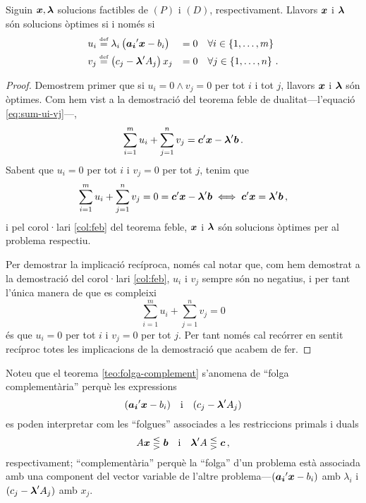 \begin{teo}\label{teo:folga-complement}
    Siguin $\boldsymbol{x}, \boldsymbol{\lambda}$ solucions factibles de $\left(P\right)$ i $\left(D\right)$, respectivament. Llavors $\boldsymbol{x}$ i $\boldsymbol{\lambda}$ són solucions òptimes si i només si
    \begin{alignat*}{2}{}
        u_i &\stackrel{\text{\tiny def}}{=} \lambda_i \left(\boldsymbol{a_i}'\boldsymbol{x} - b_i\right) &= 0 &\quad \forall i \in \left\{1, \dots, m\right\} \\
        v_j &\stackrel{\text{\tiny def}}{=} \left(c_j - \boldsymbol{\lambda}'A_j\right) x_j &= 0 &\quad \forall j \in \left\{1, \dots, n\right\}\,.
    \end{alignat*}
    \begin{proof}
    	Demostrem primer que si $u_i = 0 \land v_j = 0$ per tot $i$ i tot $j$, llavors $\boldsymbol{x}$ i $\boldsymbol{\lambda}$ són òptimes. Com hem vist a la demostració del teorema feble de dualitat---l'equació \eqref{eq:sum-ui-vj}---, 
    	\begin{equation*}
	    	\sum_{i = 1}^{m} u_i + \sum_{j = 1}^{n} v_j = \boldsymbol{c}'\boldsymbol{x} - \boldsymbol{\lambda}'\boldsymbol{b}\,.
    	\end{equation*}
    	Sabent que $u_i = 0$ per tot $i$ i $v_j = 0$ per tot $j$, tenim que \[\sum_{i = 1}^{m} u_i + \sum_{j = 1}^{n} v_j = 0 = \boldsymbol{c}'\boldsymbol{x} - \boldsymbol{\lambda}'\boldsymbol{b} \iff \boldsymbol{c}'\boldsymbol{x} = \boldsymbol{\lambda}'\boldsymbol{b}\,,  \] i pel corol·lari \ref{col:feb} del teorema feble, $\boldsymbol{x}$ i $\boldsymbol{\lambda}$ són solucions òptimes per al problema respectiu.
    	
    	Per demostrar la implicació recíproca, només cal notar que, com hem demostrat a la demostració del corol·lari \ref{col:feb}, $u_i$ i $v_j$ sempre són no negatius, i per tant l'única manera de que es compleixi \[\sum_{i=1}^{m} u_i + \sum_{j=1}^{n} v_j = 0 \] és que $u_i = 0$ per tot $i$ i $v_j = 0$ per tot $j$. Per tant només cal recórrer en sentit recíproc totes les implicacions de la demostració que acabem de fer.
    \end{proof}
\end{teo}

Noteu que el teorema \ref{teo:folga-complement} s'anomena de ``folga complementària'' perquè les expressions \[(\boldsymbol{a_i}'\boldsymbol{x}-b_i) \quad \text{i}\quad (c_j-\boldsymbol{\lambda}'A_j) \] es poden interpretar com les ``folgues'' associades a les restriccions primals i duals \[A\boldsymbol{x} \lesseqgtr \boldsymbol{b} \quad \text{i}\quad \boldsymbol{\lambda}'A \lesseqgtr \boldsymbol{c}\,,\] respectivament; ``complementària'' perquè la ``folga'' d'un problema està associada amb una component del vector variable de l'altre problema---$(\boldsymbol{a_i}'\boldsymbol{x}-b_i)$ amb $\lambda_i$ i $(c_j-\boldsymbol{\lambda}'A_j)$ amb $x_j$.


